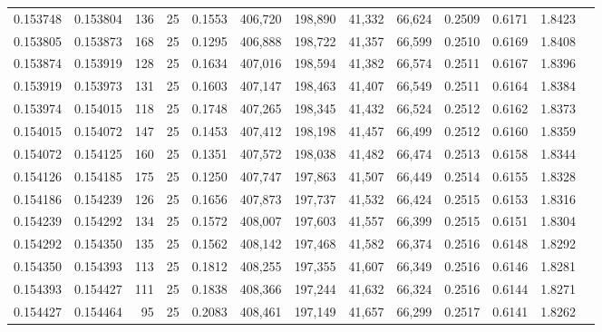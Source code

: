 \begin{tabular}{rrrrrrrrrrrrr}
0.153748 & 0.153804 &   136 &  25 &                                     0.1553 & 406,720 & 198,890 &  41,332 &  66,624 & 0.2509 & 0.6171 & 1.8423 \\
0.153805 & 0.153873 &   168 &  25 &                                     0.1295 & 406,888 & 198,722 &  41,357 &  66,599 & 0.2510 & 0.6169 & 1.8408 \\
0.153874 & 0.153919 &   128 &  25 &                                     0.1634 & 407,016 & 198,594 &  41,382 &  66,574 & 0.2511 & 0.6167 & 1.8396 \\
0.153919 & 0.153973 &   131 &  25 &                                     0.1603 & 407,147 & 198,463 &  41,407 &  66,549 & 0.2511 & 0.6164 & 1.8384 \\
0.153974 & 0.154015 &   118 &  25 &                                     0.1748 & 407,265 & 198,345 &  41,432 &  66,524 & 0.2512 & 0.6162 & 1.8373 \\
0.154015 & 0.154072 &   147 &  25 &                                     0.1453 & 407,412 & 198,198 &  41,457 &  66,499 & 0.2512 & 0.6160 & 1.8359 \\
0.154072 & 0.154125 &   160 &  25 &                                     0.1351 & 407,572 & 198,038 &  41,482 &  66,474 & 0.2513 & 0.6158 & 1.8344 \\
0.154126 & 0.154185 &   175 &  25 &                                     0.1250 & 407,747 & 197,863 &  41,507 &  66,449 & 0.2514 & 0.6155 & 1.8328 \\
0.154186 & 0.154239 &   126 &  25 &                                     0.1656 & 407,873 & 197,737 &  41,532 &  66,424 & 0.2515 & 0.6153 & 1.8316 \\
0.154239 & 0.154292 &   134 &  25 &                                     0.1572 & 408,007 & 197,603 &  41,557 &  66,399 & 0.2515 & 0.6151 & 1.8304 \\
0.154292 & 0.154350 &   135 &  25 &                                     0.1562 & 408,142 & 197,468 &  41,582 &  66,374 & 0.2516 & 0.6148 & 1.8292 \\
0.154350 & 0.154393 &   113 &  25 &                                     0.1812 & 408,255 & 197,355 &  41,607 &  66,349 & 0.2516 & 0.6146 & 1.8281 \\
0.154393 & 0.154427 &   111 &  25 &                                     0.1838 & 408,366 & 197,244 &  41,632 &  66,324 & 0.2516 & 0.6144 & 1.8271 \\
0.154427 & 0.154464 &    95 &  25 &                                     0.2083 & 408,461 & 197,149 &  41,657 &  66,299 & 0.2517 & 0.6141 & 1.8262 \\

\end{tabular}
